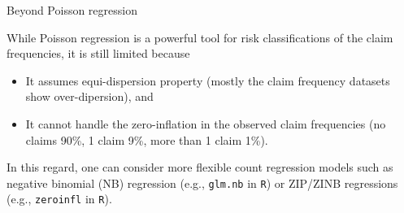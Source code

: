 \documentclass[ignorenonframetext,]{beamer}
\begin{document}
\begin{frame}{Beyond Poisson regression}

While Poisson regression is a powerful tool for risk classifications of the claim frequencies, it is still limited because
\begin{itemize}
\item It assumes equi-dispersion property (mostly the claim frequency datasets  show over-dipersion), and
\item It cannot handle the zero-inflation in the observed claim frequencies (no claims 90\%, 1 claim 9\%, more than 1 claim 1\%).
\end{itemize}
In this regard, one can consider more flexible count regression models such as negative binomial (NB) regression (e.g., \texttt{glm.nb} in \texttt{R}) or ZIP/ZINB regressions (e.g., \texttt{zeroinfl} in \texttt{R}).

\end{frame}
\end{document}
